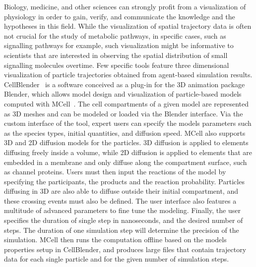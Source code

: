 Biology, medicine, and other sciences can strongly profit from a visualization of physiology in order to gain, verify, and communicate the knowledge and the hypotheses in this field.
While the visualization of spatial trajectory data is often not crucial for the study of metabolic pathways, in specific cases, such as signalling pathways for example, such visualization might be informative to scientists that are interested in observing the spatial distribution of small signalling molecules overtime.
Few specific tools feature three dimensional visualization of particle trajectories obtained from agent-based simulation results.
CellBlender~\cite{cellblender} is a software conceived as a plug-in for the 3D animation package Blender, which allows model design and visualization of particle-based models computed with MCell~\cite{kerr2008fast}.
The cell compartments of a given model are represented as 3D meshes and can be modeled or loaded via the Blender interface.
Via the custom interface of the tool, expert users can specify the models parameters such as the species types, initial quantities, and diffusion speed.
MCell also supports 3D and 2D diffusion models for the particles.
3D diffusion is applied to elements diffusing freely inside a volume, while 2D diffusion is applied to elements that are embedded in a membrane and only diffuse along the compartment surface, such as channel proteins.
Users must then input the reactions of the model by specifying the participants, the products and the reaction probability.
Particles diffusing in 3D are also able to diffuse outside their initial compartment, and these crossing events must also be defined.
The user interface also features a multitude of advanced parameters to fine tune the modeling.
Finally, the user specifies the duration of single step in nanoseconds, and the desired number of steps. 
The duration of one simulation step will determine the precision of the simulation.
MCell then runs the computation offline based on the models properties setup in CellBlender, and produces large files that contain trajectory data for each single particle and for the given number of simulation steps.
